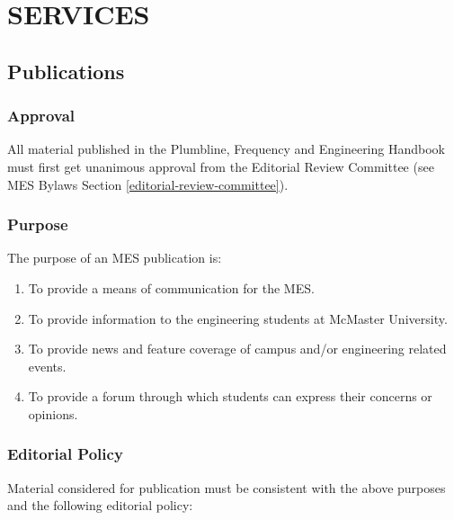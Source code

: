 \section{SERVICES}
\label{services}

\subsection{Publications}
\label{publications}

\subsubsection{Approval}
\label{approval}
All material published in the Plumbline, Frequency and Engineering
Handbook must first get unanimous approval from the Editorial Review
Committee (see MES Bylaws Section \ref{editorial-review-committee}).

\subsubsection{Purpose}
\label{purpose}

The purpose of an MES publication is:

\begin{enumerate}
 \item
  To provide a means of communication for the MES.
 \item
  To provide information to the engineering students at McMaster
  University.
 \item
  To provide news and feature coverage of campus and/or engineering
  related events.
 \item
  To provide a forum through which students can express their concerns
  or opinions.

\end{enumerate}

\subsubsection{Editorial Policy}
\label{editorial-policy}
Material considered for publication must be consistent with the above
purposes and the following editorial policy:

